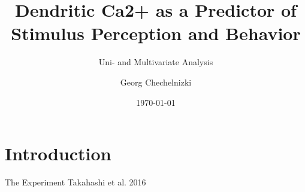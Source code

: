 \documentclass[10pt]{beamer}
\title{Dendritic Ca2+ as a Predictor of Stimulus Perception and Behavior}
\subtitle{Uni- and Multivariate Analysis}
\date{\today}
\author{Georg Chechelnizki}
\institute{BCCN Berlin}
\begin{document}
\maketitle


\section{Introduction}

\begin{frame}[fragile]{The Experiment}
Takahashi et al. 2016	
\begin{columns}[T,onlytextwidth]
      

\end{columns}
\end{frame}
\end{document}
